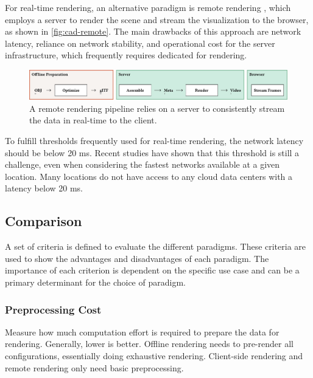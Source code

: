 For real-time rendering, an alternative paradigm is remote rendering \cite{remoteRendering}, which employs a server to render the scene and stream the visualization to the browser, as shown in \autoref{fig:cad-remote}. The main drawbacks of this approach are network latency, reliance on network stability, and operational cost for the server infrastructure, which frequently requires dedicated  for rendering.

\begin{figure}[H]
  \includegraphics[width=\columnwidth]{resources/cad-pipeline-remote.png}
  \caption{A remote rendering pipeline relies on a server to consistently stream the data in real-time to the client.}
  \label{fig:cad-remote}
\end{figure}

To fulfill thresholds frequently used for real-time rendering, the network latency should be below 20 ms. Recent studies have shown that this threshold is still a challenge, even when considering the fastest networks available at a given location. Many locations do not have access to any cloud data centers with a latency below 20 ms. \cite{cloudLatency}

\subsection*{Comparison}

A set of criteria is defined to evaluate the different paradigms. These criteria are used to show the advantages and disadvantages of each paradigm. The importance of each criterion is dependent on the specific use case and can be a primary determinant for the choice of paradigm.

\subsubsection{Preprocessing Cost}

Measure how much computation effort is required to prepare the data for rendering. Generally, lower is better. Offline rendering needs to pre-render all configurations, essentially doing exhaustive rendering. Client-side rendering and remote rendering only need basic preprocessing.

